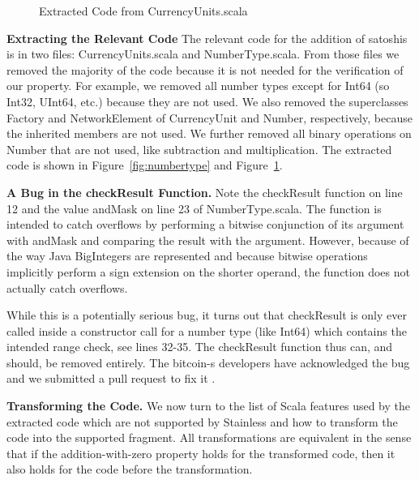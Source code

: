 \documentclass[runningheads]{llncs}
\renewcommand{\paragraph}{\textbf}%
\begin{document}
\begin{figure}

  \caption{Extracted Code from CurrencyUnits.scala}
  \label{fig:currencyunits}
\end{figure}

\paragraph{Extracting the Relevant Code} The relevant code for the
addition of satoshis is in two files: CurrencyUnits.scala and
NumberType.scala. From those files we removed the majority of the code
because it is not needed for the verification of our property.  For
example, we removed all number types except for Int64 (so Int32,
UInt64, etc.) because they are not used. We also removed the
superclasses Factory and NetworkElement of CurrencyUnit and Number,
respectively, because the inherited members are not used. We further
removed all binary operations on Number that are not used, like
subtraction and multiplication. The extracted code is shown in
Figure~\ref{fig:numbertype} and Figure~\ref{fig:currencyunits}.

\paragraph{A Bug in the checkResult Function.} Note the checkResult
function on line 12 and the value andMask on line 23 of
NumberType.scala. The function is intended to catch overflows by
performing a bitwise conjunction of its argument with andMask and
comparing the result with the argument. However, because of the way
Java BigIntegers are represented \cite{wikipedia:twocomp} and because
bitwise operations implicitly perform a sign extension
\cite{java:bigint} on the shorter operand, the function does not
actually catch overflows.

While this is a potentially serious bug, it turns out that checkResult
is only ever called inside a constructor call for a number type (like
Int64) which contains the intended range check, see lines 32-35. The
checkResult function thus can, and should, be removed entirely. The
bitcoin-s developers have acknowledged the bug and we submitted a pull
request to fix it \cite{BitcoinS:pull565}.


\paragraph{Transforming the Code.} We now turn to the list of Scala
features used by the extracted code which are not supported by
Stainless and how to transform the code into the supported fragment.
All transformations are equivalent in the sense that if the
addition-with-zero property holds for the transformed code, then it
also holds for the code before the transformation.
\end{document}
